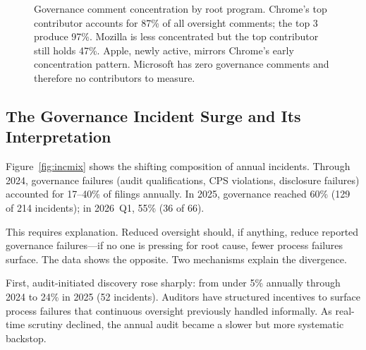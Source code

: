 \documentclass[10pt,twocolumn,letterpaper]{article}
\begin{document}
\begin{figure}[t]
\centering
{}
\caption{Governance comment concentration by root program. Chrome's top
contributor accounts for 87\% of all oversight comments; the top 3
produce 97\%. Mozilla is less concentrated but the top contributor
still holds 47\%. Apple, newly active, mirrors Chrome's early
concentration pattern. Microsoft has zero governance comments and
therefore no contributors to measure.}
\label{fig:concentration}
\end{figure}

\subsection{The Governance Incident Surge and Its Interpretation}
\label{sec:govsurge}

Figure~\ref{fig:incmix} shows the shifting composition of annual incidents.
Through 2024, governance failures (audit qualifications, CPS violations,
disclosure failures) accounted for 17--40\% of filings annually. In 2025,
governance reached 60\% (129 of 214 incidents); in 2026~Q1, 55\%
(36 of 66).

This requires explanation. Reduced oversight should, if anything, reduce
reported governance failures---if no one is pressing for root cause,
fewer process failures surface. The data shows the opposite. Two mechanisms
explain the divergence.

First, audit-initiated discovery rose sharply: from under 5\% annually
through 2024 to 24\% in 2025 (52 incidents). Auditors have structured
incentives to surface process failures that continuous oversight previously
handled informally. As real-time scrutiny declined, the annual audit became
a slower but more systematic backstop.
\end{document}
